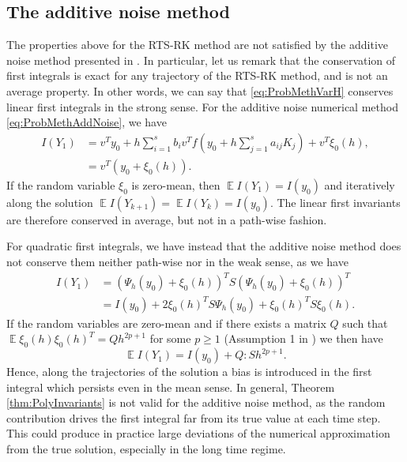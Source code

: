 \documentclass{siamart1116}
\numberwithin{theorem}{section}
\newcommand{\E}{\operatorname{\mathbb{E}}}
\newcommand{\sksum}{{\textstyle\sum}}
\newcommand{\corr}[1]{{\color{bordeaux}#1}}
\begin{document}
\corr{
\subsection{The additive noise method} The properties above for the RTS-RK method are not satisfied by the additive noise method presented in \cite{CGS16}. In particular, let us remark that the conservation of first integrals is exact for any trajectory of the RTS-RK method, and is not an average property. In other words, we can say that \eqref{eq:ProbMethVarH} conserves linear first integrals in the strong sense. For the additive noise numerical method \eqref{eq:ProbMethAddNoise}, we have
\begin{equation}
	\begin{aligned}
	I(Y_1) &= v^T y_0 + h \sksum_{i=1}^s b_iv^T f(y_0 + h\sksum_{j=1}^{s} a_{ij}K_j) + v^T \xi_0(h), \\
	&= v^T (y_0 + \xi_0(h)).
	\end{aligned}
\end{equation}
If the random variable $\xi_0$ is zero-mean, then $\E I(Y_1) = I(y_0)$ and iteratively along the solution $\E I(Y_{k+1}) = \E I(Y_k) = I(y_0)$. The linear first invariants are therefore conserved in average, but not in a path-wise fashion.

For quadratic first integrals, we have instead that the additive noise method does not conserve them neither path-wise nor in the weak sense, as we have
\begin{equation}
\begin{aligned}
	I(Y_1) &= (\Psi_h(y_0) + \xi_0(h))^T S (\Psi_h(y_0) + \xi_0(h))^T \\
	&= I(y_0) + 2\xi_0(h)^T S  \Psi_h(y_0) + \xi_0(h)^T S \xi_0(h).
\end{aligned}
\end{equation}
If the random variables are zero-mean and if there exists a matrix $Q$ such that $\E\xi_0(h)\xi_0(h)^T = Qh^{2p + 1}$ for some $p \geq 1$ (Assumption 1 in \cite{CGS16}) we then have
\begin{equation}\label{eq:BiasQuadraticAddNoise}
\E I(Y_1) = I(y_0) + Q : S h^{2p + 1}.
\end{equation}
Hence, along the trajectories of the solution a bias is introduced in the first integral which persists even in the mean sense. In general, Theorem \ref{thm:PolyInvariants} is not valid for the additive noise method, as the random contribution drives the first integral far from its true value at each time step. This could produce in practice large deviations of the numerical approximation from the true solution, especially in the long time regime.}
\end{document}
